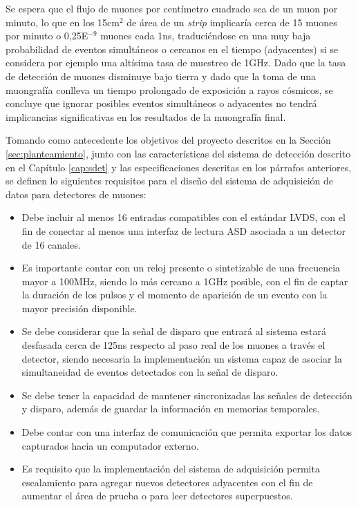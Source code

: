  	Se espera que el flujo de muones por centímetro cuadrado sea de un muon por minuto\cite{Rocca2018CosmicUs}, lo que en los 15cm$^2$ de área de un \textit{strip} implicaría cerca de 15 muones por minuto o 0,25E$^{-9}$ muones cada 1ns, traduciéndose en una muy baja probabilidad de eventos simultáneos o cercanos en el tiempo (adyacentes) si se considera por ejemplo una altísima tasa de muestreo de 1GHz. Dado que la tasa de detección de muones disminuye bajo tierra y dado que la toma de una muongrafía conlleva un tiempo prolongado de exposición a rayos cósmicos, se concluye que ignorar posibles eventos simultáneos o adyacentes no tendrá implicancias significativas en los resultados de la muongrafía final.
	
	Tomando como antecedente los objetivos del proyecto descritos en la Sección \ref{sec:planteamiento}, junto con las características del sistema de detección descrito en el Capítulo \ref{cap:sdet} y las especificaciones descritas en los párrafos anteriores, se definen lo siguientes requisitos para el diseño del sistema de adquisición de datos para detectores de muones:
	
	\begin{itemize}
		\item Debe incluir al menos 16 entradas compatibles con el estándar LVDS, con el fin de conectar al menos una interfaz de lectura ASD asociada a un detector de 16 canales.
		\item Es importante contar con un reloj presente o sintetizable de una frecuencia mayor a 100MHz, siendo lo más cercano a 1GHz posible, con el fin de captar la duración de los pulsos y el momento de aparición de un evento con la mayor precisión disponible.
		\item Se debe considerar que la señal de disparo que entrará al sistema estará desfasada cerca de 125ns\cite{Oyanadel2020SistemaSTGC} respecto al paso real de los muones a través el detector, siendo necesaria la implementación un sistema capaz de asociar la simultaneidad de eventos detectados con la señal de disparo.
		\item  Se debe tener la capacidad de mantener sincronizadas las señales de detección y disparo, además de guardar la información en memorias temporales.
		\item Debe contar con una interfaz de comunicación que permita exportar los datos capturados hacia un computador externo.
		\item Es requisito que la implementación del sistema de adquisición permita escalamiento para agregar nuevos detectores adyacentes con el fin de aumentar el área de prueba o para leer detectores superpuestos.
	\end{itemize}
	

